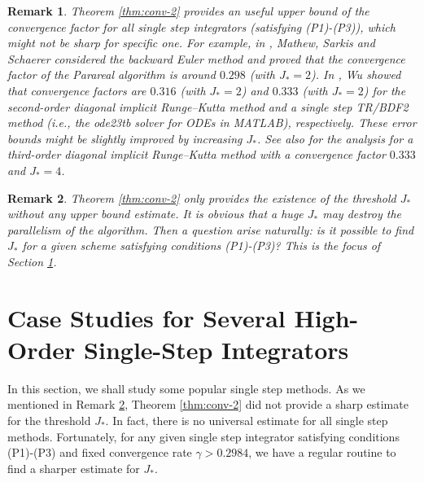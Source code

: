 \documentclass[a4paper, oneside]{book}
\newtheorem{remark}{Remark}[section]
\begin{document}
\begin{remark}\label{rem:conv-1}
Theorem \ref{thm:conv-2} provides an useful upper bound of the convergence factor for all single step integrators
(satisfying (P1)-(P3)),
which might not be sharp for specific one. For example, in \cite[Lemma 4.3]{MathewSarkisSchaerer:2010},
Mathew, Sarkis and Schaerer considered the backward Euler method and proved
that the convergence factor of the Parareal algorithm is around $0.298$ (with $J_*=2$).
In \cite{Wu:2015}, Wu showed that convergence factors are $0.316$ (with $J_*=2$) and $0.333$ (with $J_*=2$)
for the second-order diagonal implicit Runge--Kutta method
and a single step TR/BDF2 method (i.e., the ode23tb solver for ODEs in MATLAB), respectively.
These error bounds might be slightly improved by increasing $J_*$.
See also \cite{WuZhou:2015} for the analysis for a third-order diagonal implicit Runge--Kutta method with a convergence factor $0.333$ and $J_*=4$.
\end{remark}


\begin{remark}\label{rem:conv-2}
Theorem \ref{thm:conv-2} only provides the existence of the threshold $J_*$ without any upper bound estimate.
It is obvious that a huge $J_*$ may destroy the parallelism of the algorithm.
Then a question arise naturally: is it possible to find $J_*$ for a given scheme satisfying conditions (P1)-(P3)? This is the focus of Section \ref{sec:RK}.
\end{remark}


\section{Case Studies for Several High-Order Single-Step Integrators}\label{sec:RK}

In this section, we shall study some popular single step methods. As we mentioned in Remark \ref{rem:conv-2},
Theorem \ref{thm:conv-2} did not provide a sharp estimate for the threshold $J_*$.
In fact, there is no universal estimate for all single step methods. Fortunately,
for any given single step integrator satisfying conditions (P1)-(P3) and fixed convergence rate
$\gamma>0.2984$,
we have a regular routine to find a sharper estimate for $J_*$.
\end{document}
